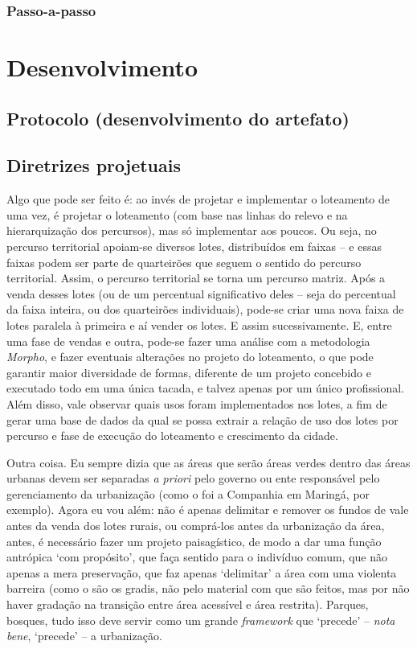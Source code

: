 \documentclass[]{report}
\begin{document}
\section{Passo-a-passo}

\part[Desenvolvimento]{Desenvolvimento}
	
	\chapter{Protocolo (desenvolvimento do artefato)}
	\chapter{Diretrizes projetuais}
	
	Algo que pode ser feito é: ao invés de projetar e implementar o loteamento de uma vez, é projetar o loteamento (com base nas linhas do relevo e na hierarquização dos percursos), mas só implementar aos poucos. Ou seja, no percurso territorial apoiam-se diversos lotes, distribuídos em faixas – e essas faixas podem ser parte de quarteirões que seguem o sentido do percurso territorial. Assim, o percurso territorial se torna um percurso matriz. Após a venda desses lotes (ou de um percentual significativo deles – seja do percentual da faixa inteira, ou dos quarteirões individuais), pode-se criar uma nova faixa de lotes paralela à primeira e aí vender os lotes. E assim sucessivamente. E, entre uma fase de vendas e outra, pode-se fazer uma análise com a metodologia \textit{Morpho}, e fazer eventuais alterações no projeto do loteamento, o que pode garantir maior diversidade de formas, diferente de um projeto concebido e executado todo em uma única tacada, e talvez apenas por um único profissional. Além disso, vale observar quais usos foram implementados nos lotes, a fim de gerar uma base de dados da qual se possa extrair a relação de uso dos lotes por percurso e fase de execução do loteamento e crescimento da cidade.

	Outra coisa. Eu sempre dizia que as áreas que serão áreas verdes dentro das áreas urbanas devem ser separadas \textit{a priori} pelo governo ou ente responsável pelo gerenciamento da urbanização (como o foi a Companhia em Maringá, por exemplo). Agora eu vou além: não é apenas delimitar e remover os fundos de vale antes da venda dos lotes rurais, ou comprá-los antes da urbanização da área, antes, é necessário fazer um projeto paisagístico, de modo a dar uma função antrópica `com propósito', que faça sentido para o indivíduo comum, que não apenas a mera preservação, que faz apenas `delimitar' a área com uma violenta barreira (como o são os gradis, não pelo material com que são feitos, mas por não haver gradação na transição entre área acessível e área restrita). Parques, bosques, tudo isso deve servir como um grande \textit{framework} que `precede' – \textit{nota bene}, `precede' – a urbanização.
\end{document}
